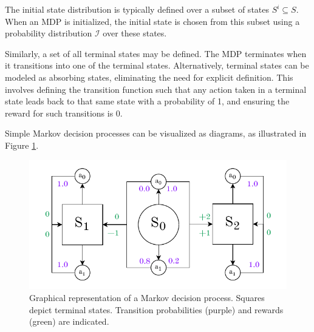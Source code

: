 \documentclass[
  digital,     %
  oneside,     %
  nosansbold,  %
  nocolorbold, %
  lof,         %
  lot,         %
]{fithesis4}
\begin{document}
The initial state distribution is typically defined over a subset of states $S^i \subseteq S$. When an MDP is initialized, the initial state is chosen from this subset using a probability distribution $\mathcal{I}$ over these states.

Similarly, a set of all terminal states may be defined. The MDP terminates when it transitions into one of the terminal states. Alternatively, terminal states can be modeled as absorbing states, eliminating the need for explicit definition. This involves defining the transition function such that any action taken in a terminal state leads back to that same state with a probability of 1, and ensuring the reward for such transitions is 0.

Simple Markov decision processes can be visualized as diagrams, as illustrated in Figure \ref{fig:mdp}.

\begin{figure}
    \centering
    \includegraphics[width=1\linewidth]{diagrams/mdp.pdf}
    \caption{Graphical representation of a Markov decision process. Squares depict terminal states. Transition probabilities (purple) and rewards (green) are indicated.}
    \label{fig:mdp}
\end{figure}
\end{document}
